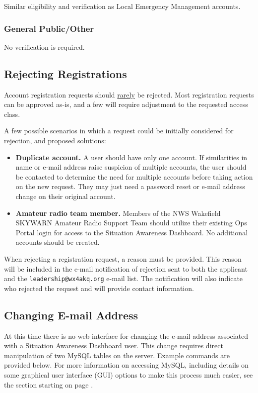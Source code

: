 \documentclass[pdflatex,letterpaper,twoside,12pt]{book}
\begin{document}
Similar eligibility and verification as Local Emergency Management accounts.

\subsubsection{General Public/Other}

No verification is required.

\subsection{Rejecting Registrations}

Account registration requests should \underline{rarely} be rejected.  Most registration requests can be approved as-is, and a few will require adjustment to the requested access class.

A few possible scenarios in which a request could be initially considered for rejection, and proposed solutions:

\begin{itemize}
\item {\bf Duplicate account.}  A user should have only one account.  If similarities in name or e-mail address raise suspicion of multiple accounts, the user should be contacted to determine the need for multiple accounts before taking action on the new request.  They may just need a password reset or e-mail address change on their original account.
\item {\bf Amateur radio team member.}  Members of the NWS Wakefield SKYWARN Amateur Radio Support Team should utilize their existing Ops Portal login for access to the Situation Awareness Dashboard.  No additional accounts should be created.
\end{itemize}

When rejecting a registration request, a reason must be provided.  This reason will be included in the e-mail notification of rejection sent to both the applicant and the \verb|leadership@wx4akq.org| e-mail list.  The notification will also indicate who rejected the request and will provide contact information.

\subsection{Changing E-mail Address}

At this time there is no web interface for changing the e-mail address associated with a Situation Awareness Dashboard user.  This change requires direct manipulation of two MySQL tables on the server.  Example commands are provided below.  For more information on accessing MySQL, including details on some graphical user interface (GUI) options to make this process much easier, see the  section starting on page \pageref{database-server}.
\end{document}

